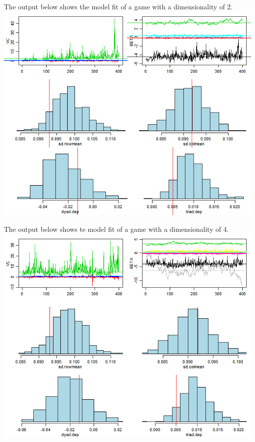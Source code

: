 \documentclass[12pt,twoside]{dukestatscithesis}
\theoremstyle{definition}
\theoremstyle{definition}
\theoremstyle{definition}
\theoremstyle{remark}
\begin{document}
The output below shows the model fit of a game with a dimensionality of
2. \includegraphics{img/amenoutput.png}

The output below shows te model fit of a game with a dimensionality of
4. \includegraphics{img/amenoutput4.png}
\end{document}
